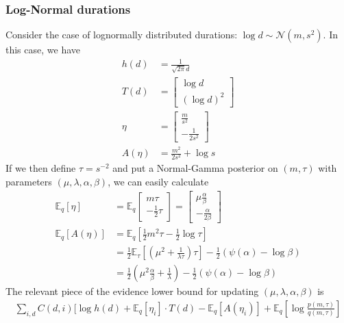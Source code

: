 \documentclass[11pt]{article}
\begin{document}
\subsubsection{Log-Normal durations}
Consider the case of lognormally distributed durations: $\log d \sim \mathcal{N}(m, s^2)$. In this case, we have
\begin{align}
    h(d) &= \frac{1}{\sqrt{2\pi} d} \\
    T(d) &= \begin{bmatrix}
    \log d \\
    (\log d) ^2
    \end{bmatrix} \\
    \eta &= \begin{bmatrix}
    \frac{m}{s^2} \\
    -\frac{1}{2s^2}
    \end{bmatrix} \\
    A(\eta) &= \frac{m^2}{2s^2} + \log s
\end{align}
If we then define $\tau = s^{-2}$ and put a Normal-Gamma posterior on $(m, \tau)$ with parameters $(\mu, \lambda, \alpha, \beta)$, we can easily calculate
\begin{align}
    \mathbb{E}_q[\eta] &= \mathbb{E}_q 
    \begin{bmatrix}
    m\tau \\
    -\frac{1}{2}\tau
    \end{bmatrix} =
    \begin{bmatrix}
    \mu\frac{\alpha}{\beta} \\
    -\frac{\alpha}{2\beta}
    \end{bmatrix} \\
    \mathbb{E}_q[A(\eta)] &= \mathbb{E}_q\left[ 
    \frac{1}{2}m^2\tau - \frac{1}{2} \log \tau
    \right] \\
    &= \frac{1}{2} \mathbb{E}_\tau\left[
    \left(\mu^2 + \frac{1}{\lambda \tau}\right)\tau 
    \right]
    -\frac{1}{2} (\psi(\alpha) - \log \beta) \\
    &= \frac{1}{2} \left(\mu^2 \frac{\alpha}{\beta} + \frac{1}{\lambda} \right)
    -\frac{1}{2} (\psi(\alpha) - \log \beta)
\end{align}
The relevant piece of the evidence lower bound for updating $(\mu, \lambda, \alpha, \beta)$ is
\begin{multline}
    \sum_{i, d} C(d, i) [ \log h(d) + \mathbb{E}_q[\eta_i] \cdot T(d) -
    \mathbb{E}_q[A(\eta_i)] + \mathbb{E}_q\left[\log \frac{p(m, \tau)}{q(m, \tau)} \right]
\end{multline}
\end{document}
